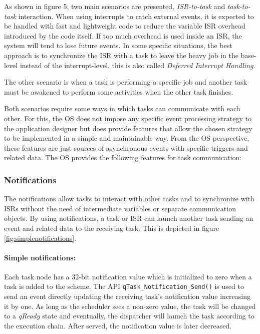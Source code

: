 \documentclass{article}
\begin{document}


As shown in figure 5, two main scenarios are presented, \textit{ISR-to-task} and \textit{task-to-task} interaction.  When using interrupts to catch external events, it is expected to be handled with fast and lightweight code to reduce the variable ISR overhead introduced by the code itself. If too much overhead is used inside an ISR, the system will tend to lose future events. In some specific situations, the best approach is to synchronize the ISR with a task to leave the heavy job in the base-level instead of the interrupt-level, this is also called  \textit{Deferred Interrupt Handling}.

The other scenario is when a task is performing a specific job and another task must be awakened to perform some activities when the other task finishes.

\newline
Both scenarios require some ways in which tasks can communicate with each other.
For this, the OS does not impose any specific event processing strategy to the application designer but does provide features that allow the chosen strategy to be implemented in a simple and maintainable way. From the OS perspective, these features are just sources of asynchronous events with specific triggers and related data. 
\newline
\newline                                                                                                                                                                                                   
The OS provides the following features for task communication:

\subsubsection{Notifications} \label{osnotifications}
The notifications allow tasks to interact with other tasks and to synchronize with ISRs without the need of intermediate variables or separate communication objects. By using notifications, a task or ISR can launch another task sending an event and related data to the receiving task.  This is depicted in figure \ref{fig:simplenotifications}.



\paragraph{Simple notifications:}
Each task node has a 32-bit notification value which is initialized to zero when a task is added to the scheme. The API \lstinline{qTask_Notification_Send()}  is used to send an event directly updating the receiving task's notification value increasing it by one. As long as the scheduler sees a non-zero value, the task will be changed to a \textit{qReady} state and eventually, the dispatcher will launch the task according to the execution chain. After served, the notification value is later decreased.\\ 
\end{document}
